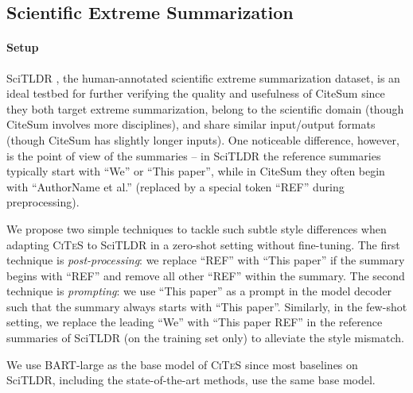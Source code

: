 \documentclass[11pt]{article}
\newcommand{\ours}{\textsc{CiTeS}\xspace}
\newcommand{\ourdata}{CiteSum\xspace}
\begin{document}
\subsection{Scientific Extreme Summarization}
\label{sec_transfer_scitldr}



\paragraph{Setup}
SciTLDR \cite{cachola-etal-2020-tldr}, the human-annotated scientific extreme summarization dataset, is an ideal testbed for further verifying the quality and usefulness of \ourdata since they both target extreme summarization, belong to the scientific domain (though \ourdata involves more disciplines), and share similar input/output formats (though \ourdata has slightly longer inputs).
One noticeable difference, however, is the point of view of the summaries -- in SciTLDR the reference summaries typically start with ``We'' or ``This paper'', while in \ourdata they often begin with ``AuthorName et al.'' (replaced by a special token ``REF'' during preprocessing).

We propose two simple techniques to tackle such subtle style differences when adapting \ours to SciTLDR in a zero-shot setting without fine-tuning.
The first technique is \textit{post-processing}: we replace ``REF'' with ``This paper'' if the summary begins with ``REF'' and remove all other ``REF'' within the summary.
The second technique is \textit{prompting}: we use ``This paper'' as a prompt in the model decoder such that the summary always starts with ``This paper''. 
Similarly, in the few-shot setting, we replace the leading ``We'' with ``This paper REF'' in the reference summaries of SciTLDR (on the training set only) to alleviate the style mismatch.

We use BART-large \cite{lewis-etal-2020-bart} as the base model of \ours since most baselines on SciTLDR, including the state-of-the-art methods, use the same base model.
\end{document}
